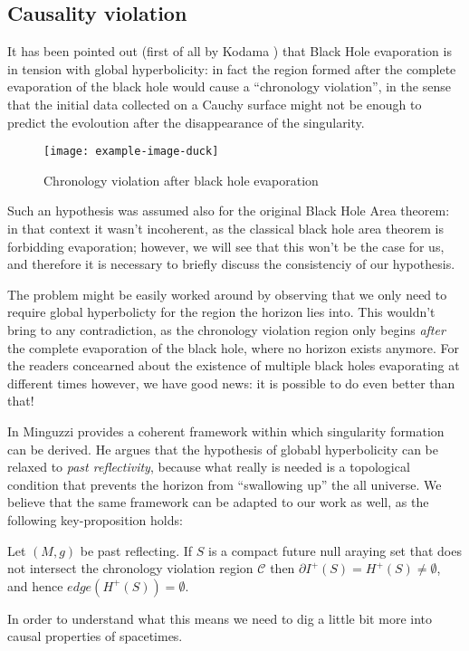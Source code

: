 \subsection{Causality violation}
\label{subsec:causaliy-bh-evaporation}
It has been pointed out (first of all by Kodama \cite{Kodama:1979vm}) that Black Hole evaporation is in tension with global hyperbolicity: in fact the region formed after the complete evaporation of the black hole would cause a ``chronology violation'', in the sense that the initial data collected on a Cauchy surface might not be enough to predict the evoloution after the disappearance of the singularity.

\begin{figure}
	\centering
	\texttt{[image: example-image-duck]}
	\caption{Chronology violation after black hole evaporation}
\end{figure}

Such an hypothesis was assumed also for the original Black Hole Area theorem: in that context it wasn't incoherent, as the classical black hole area theorem is forbidding evaporation; however, we will see that this won't be the case for us, and therefore it is necessary to briefly discuss the consistenciy of our hypothesis.

The problem might be easily worked around by observing that we only need to require global hyperbolicty for the region the horizon lies into. This wouldn't bring to any contradiction, as the chronology violation region only begins \emph{after} the complete evaporation of the black hole, where no horizon exists anymore. For the readers concearned about the existence of multiple black holes evaporating at different times however, we have good news: it is possible to do even better than that!

In \cite{minguzzi2020gravitational} Minguzzi provides a coherent framework within which singularity formation can be derived. He argues that the hypothesis of globabl hyperbolicity can be relaxed to \emph{past reflectivity}, because what really is needed is a topological condition that prevents the horizon from ``swallowing up'' the all universe. We believe that the same framework can be adapted to our work as well, as the following key-proposition holds:
\begin{prop}
	Let \((M,g)\) be past reflecting. If \(S\) is a compact future null araying set that does not intersect the chronology violation region \(\mathcal{C}\) then \(\partial I^+(S) = H^+(S) \neq \emptyset\), and hence \(edge(H^+(S)) = \emptyset\).
\end{prop}

In order to understand what this means we need to dig a little bit more into causal properties of spacetimes.
